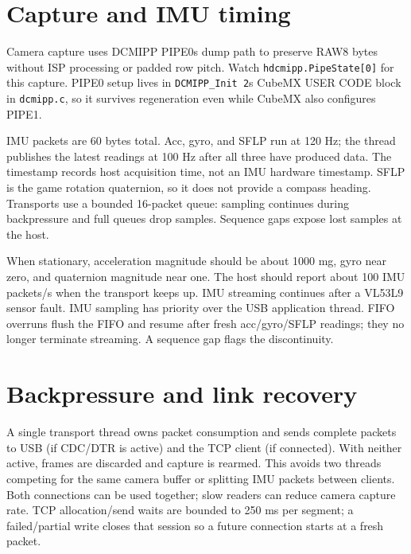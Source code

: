 \documentclass[10pt,a4paper,oneside]{report}
\begin{document}
\section{Capture and IMU timing}\label{wiki-tools-streaming-and-diagnostics--capture-and-imu-timing}

Camera capture uses DCMIPP PIPE0\textquotesingle s dump path to preserve RAW8 bytes without ISP processing or padded row pitch. Watch \texttt{hdcmipp.\allowbreak{}PipeState[0]} for this capture. PIPE0 setup lives in \texttt{DCMIPP\_\allowbreak{}Init 2}\textquotesingle s CubeMX USER CODE block in \texttt{dcmipp.\allowbreak{}c}, so it survives regeneration even while CubeMX also configures PIPE1.

IMU packets are 60 bytes total. Acc, gyro, and SFLP run at 120 Hz; the thread publishes the latest readings at 100 Hz after all three have produced data. The timestamp records host acquisition time, not an IMU hardware timestamp. SFLP is the game rotation quaternion, so it does not provide a compass heading. Transports use a bounded 16-packet queue: sampling continues during backpressure and full queues drop samples. Sequence gaps expose lost samples at the host.

When stationary, acceleration magnitude should be about 1000 mg, gyro near zero, and quaternion magnitude near one. The host should report about 100 IMU packets/s when the transport keeps up. IMU streaming continues after a VL53L9 sensor fault. IMU sampling has priority over the USB application thread. FIFO overruns flush the FIFO and resume after fresh acc/gyro/SFLP readings; they no longer terminate streaming. A sequence gap flags the discontinuity.

\section{Backpressure and link recovery}\label{wiki-tools-streaming-and-diagnostics--backpressure-and-link-recovery}

A single transport thread owns packet consumption and sends complete packets to USB (if CDC/DTR is active) and the TCP client (if connected). With neither active, frames are discarded and capture is rearmed. This avoids two threads competing for the same camera buffer or splitting IMU packets between clients. Both connections can be used together; slow readers can reduce camera capture rate. TCP allocation/send waits are bounded to 250 ms per segment; a failed/partial write closes that session so a future connection starts at a fresh packet.
\end{document}
